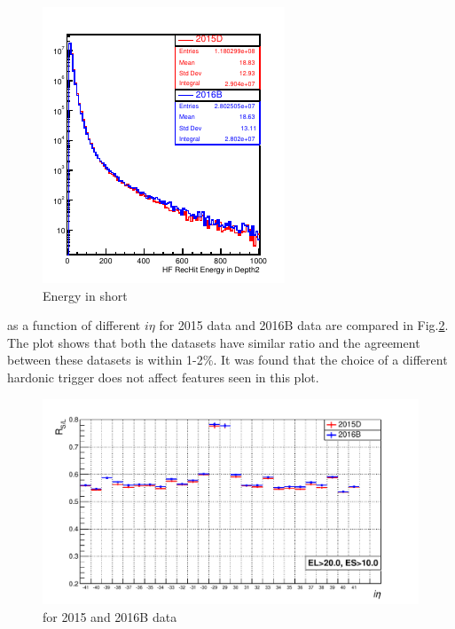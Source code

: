 \begin{figure}[!h]
\begin{minipage}[b]{0.48\linewidth}
\includegraphics[width=0.99\linewidth]{../Figures/Chap2/ImageFiles_HF/BasicPics/Comp2015vs2016B/RecHitES_2015DPUwt_2016B.pdf}
\captionsetup{width=.9\linewidth}
\caption{Energy in short}
\label{RecHitES_2015DPUwt_2016B}
\end{minipage}
\end{figure}

\ratiosl as a function of different $i\eta$ for 2015 data and 2016B data are compared in Fig.\ref{fig:Ratio2015vs2015B}. The plot shows that both the datasets have similar ratio and the agreement between these datasets is within 1-2\%. It was found that the choice of a different hardonic trigger does not affect \ratiosl features seen in this plot.
\begin{figure}[h!]
\centering
\includegraphics[width=0.7\linewidth]{../Figures/Chap2/ImageFiles_HF/Ratio/2015vs2016/Ratio2015vs2015B}
\caption{\ratiosl for 2015 and 2016B data}
\label{fig:Ratio2015vs2015B}
\end{figure}

